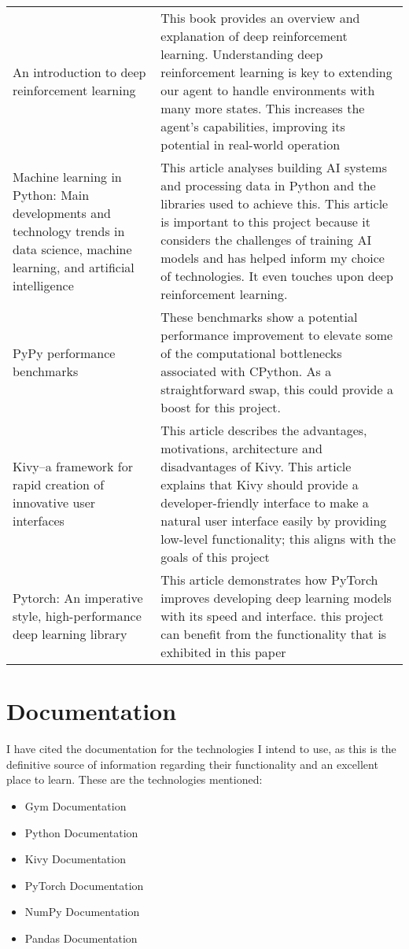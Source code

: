 \documentclass[]{final_report}
\begin{document}
\begin{xltabular}{\textwidth}{p{6cm} X}
An introduction to deep reinforcement learning\cite{franccois2018introduction} & This book provides an overview and explanation of deep reinforcement learning. Understanding deep reinforcement learning is key to extending our agent to handle environments with many more states. This increases the agent's capabilities, improving its potential in real-world operation   \\
Machine learning in Python: Main developments and technology trends in data science, machine learning, and artificial intelligence\cite{raschka2020machine} & This article analyses building AI systems and processing data in Python and the libraries used to achieve this. This article is important to this project because it considers the challenges of training AI models and has helped inform my choice of technologies. It even touches upon deep reinforcement learning.\\
PyPy performance benchmarks\cite{pypy2023benchmarks} & These benchmarks show a potential performance improvement to elevate some of the computational bottlenecks associated with CPython. As a straightforward swap, this could provide a boost for this project. \\
Kivy--a framework for rapid creation of innovative user interfaces\cite{virbel2011kivy} & This article describes the advantages, motivations, architecture and disadvantages of Kivy. This article explains that Kivy should provide a developer-friendly interface to make a natural user interface easily by providing low-level functionality; this aligns with the goals of this project \\
Pytorch: An imperative style, high-performance deep learning library\cite{paszke2019pytorch} & This article demonstrates how PyTorch improves developing deep learning models with its speed and interface. this project can benefit from the functionality that is exhibited in this paper\\
\end{xltabular}

\section{Documentation}
I have cited the documentation for the technologies I intend to use, as this is the definitive source of information regarding their functionality and an excellent place to learn. These are the technologies mentioned: 

\begin{itemize}
  \item Gym Documentation\cite{gym}
  \item Python Documentation\cite{python}
  \item Kivy Documentation\cite{kivy}
  \item PyTorch Documentation\cite{pytorch}
  \item NumPy Documentation\cite{numpy}
  \item Pandas Documentation\cite{pandas} 
\end{itemize}


\newpage



\label{endpage}
\end{document}
